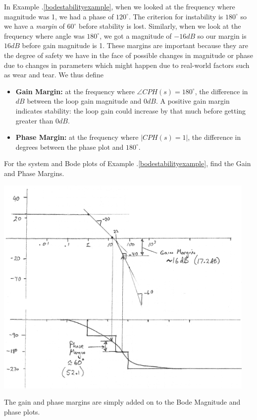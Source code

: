 In Example \thechapter.\ref{bodestabilityexample}, when we looked at the frequency where magnitude was 1, we had a phase of $120^\circ$.  The criterion for instability is $180^\circ$ so we have a {\it margin} of $60^\circ$ before stability is lost.  Similarly, when we look at the frequency where angle was $180^\circ$, we got a magnitude of $-16dB$ so our margin is $16dB$ before gain magnitude is 1.   These margins are important because they are the degree of safety we have in the face of possible changes in magnitude or phase due to changes in parameters which might happen due to real-world factors such as wear and tear.   We thus define

\begin{itemize}
  \item {\bf Gain  Margin:} at the frequency where $\angle CPH(s) = 180^\circ$, the difference in $dB$ between the loop gain magnitude and 0$dB$.  A positive gain margin indicates stability:
  the loop gain could increase by that much before getting greater than $0dB$.
  \item {\bf Phase Margin:} at the frequency where $\left |CPH(s) = 1\right |$, the difference in degrees  between the phase plot and $180^\circ$.
\end{itemize}


\begin{ExampleSmall}
For the system and Bode plots of Example \thechapter.\ref{bodestabilityexample}, find the Gain and Phase Margins.

\includegraphics[width=5.0in]{figs06/00794a.png}

The gain and phase margins are simply added on to the Bode Magnitude and phase plots.

\end{ExampleSmall}

